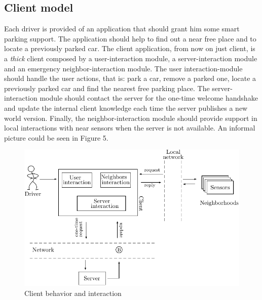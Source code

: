 \documentclass[11pt]{article}
\begin{document}
\subsection{Client model}
Each driver is provided of an application that should grant him some smart parking support. The application should help to find out a near free place and to locate a previously parked car. The client application, from now on just client, is a \emph{thick} client composed by a user-interaction module, a server-interaction module and an emergency neighbor-interaction module. The user interaction-module should handle the user actions, that is: park a car, remove a parked one, locate a previously parked car and find the nearest free parking place. The server-interaction module should contact the server for the one-time welcome handshake and update the internal client knowledge each time the server publishes a new world version. Finally, the neighbor-interaction module should provide support in local interactions with near sensors when the server is not available. An informal picture could be seen in Figure 5.
\begin{figure}
  \centering
	\includegraphics[scale=1]{client}
  \caption{Client behavior and interaction}
\end{figure}
\end{document}
